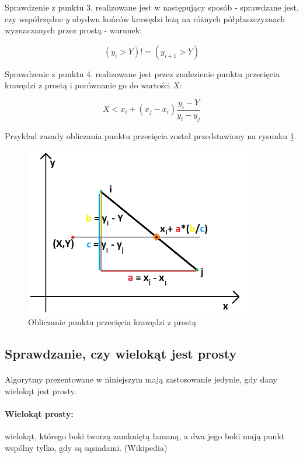 \documentclass{article}
\begin{document}
Sprawdzenie z punktu 3. realizowane jest w następujący sposób - sprawdzane jest, czy współrzędne \(y\) obydwu końców krawędzi leżą na różnych półpłaszczyznach wyznaczanych przez prostą - warunek:

$$(y_i > Y) != (y_{i+1} > Y)$$

Sprawdzenie z punktu 4. realizowane jest przez znalezienie punktu przecięcia krawędzi z prostą i porównanie go do wartości \(X\):

$$X < x_i + (x_j - x_i)\frac{y_i - Y}{y_i - y_j}$$

Przykład zasady obliczania punktu przecięcia został przedstawiony na rysunku \ref{fig:przeciecie}.

\begin{figure}[H]
    \centering
    \includegraphics[width=10cm]{przeciecie.png}
    \caption{Obliczanie punktu przecięcia krawędzi z prostą}
    \label{fig:przeciecie}
\end{figure}

\subsection{Sprawdzanie, czy wielokąt jest prosty}
\paragraph{}Algorytmy prezentowane w niniejszym mają zastosowanie jedynie, gdy dany wielokąt jest prosty.
\paragraph{Wielokąt prosty:} wielokąt, którego boki tworzą zamkniętą łamaną, a dwa jego boki mają punkt wspólny tylko, gdy są sąsiadami. (Wikipedia)
\end{document}
